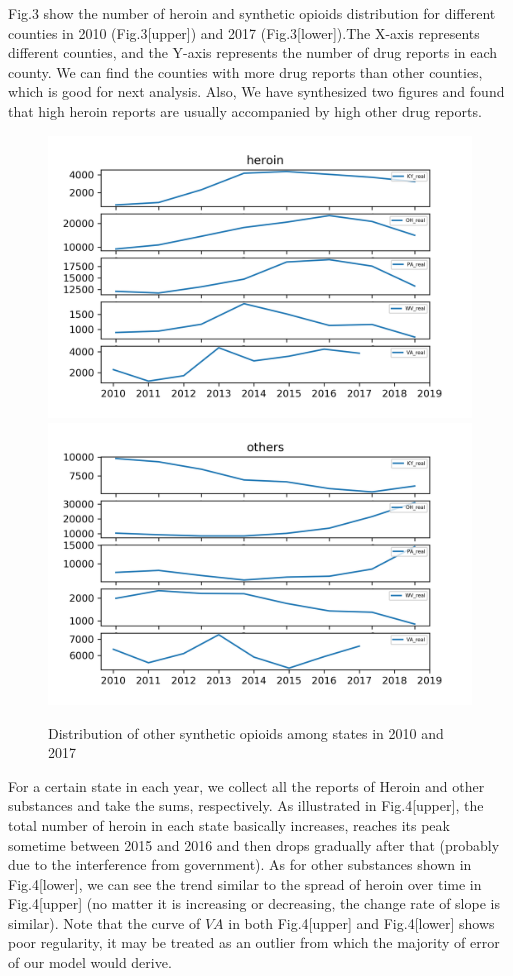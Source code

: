 \documentclass[12pt]{article}
\begin{document}
Fig.3 show the number of heroin and synthetic opioids distribution for different counties in 2010 (Fig.3[upper]) and 2017 (Fig.3[lower]).The X-axis represents different counties, and the Y-axis represents the number of drug reports in each county. We can find the counties with more drug reports than other counties, which is good for next analysis.  Also, We have synthesized two figures and found that high heroin reports are usually accompanied by high other drug reports.


\begin{figure}[!htbp]
\small
\centering
\includegraphics[width=14cm]{Fig/heroin_states_real}
\includegraphics[width=14cm]{Fig/others_states_real}
\caption{Distribution of other synthetic opioids among states in 2010 and 2017}
\end{figure}

For a certain state in each year, we collect all the reports of Heroin and other substances and take the sums, respectively. As illustrated in Fig.4[upper], the total number of heroin in each state basically increases, reaches its peak sometime between 2015 and 2016 and then drops gradually after that (probably due to the interference from government). As for other substances shown in Fig.4[lower], we can see the trend similar to the spread of heroin over time in Fig.4[upper] (no matter it is increasing or decreasing, the change rate of slope is similar). Note that the curve of $VA$ in both Fig.4[upper] and Fig.4[lower] shows poor regularity, it may be treated as an outlier from which the majority of error of our model would derive.
\end{document}
